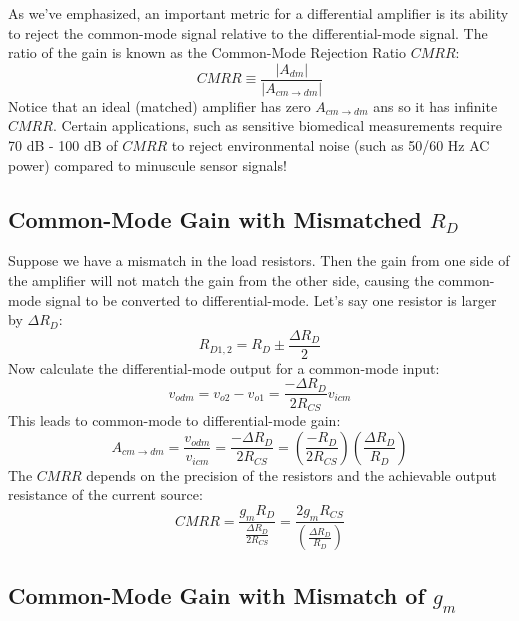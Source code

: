 As we've emphasized, an important metric for a differential amplifier is its ability to reject the common-mode signal relative to the differential-mode signal.  The ratio of the gain is known as the Common-Mode Rejection Ratio $CMRR$:
%
\begin{equation} 
	CMRR \equiv \frac{{\left| {{A_{dm}}} \right|}}{{\left| {{A_{cm \to dm}}} \right|}}
\end{equation}
%
Notice that an ideal (matched) amplifier has zero $A_{cm \to dm}$ ans so it has infinite $CMRR$. Certain applications, such as sensitive biomedical measurements require 70 dB - 100 dB of $CMRR$ to reject environmental noise (such as 50/60 Hz AC power) compared to minuscule sensor signals!



\subsection{Common-Mode Gain with Mismatched $R_D$}

Suppose we have a mismatch in the load resistors.  Then the gain from one side of the amplifier will not match the gain from the other side, causing the common-mode signal to be converted to differential-mode.  Let's say one resistor is larger by $\Delta R_{D}$:
%
\begin{equation} 
	{R_{D1,2}} = {R_D} \pm \frac{\Delta {R_D}}{2}
\end{equation}
% 
Now calculate the differential-mode output for a common-mode input:
%
\begin{equation}
	{v_{odm}} = {v_{o2}} - {v_{o1}} = \frac{{ - \Delta {R_D}}}{{2{R_{CS}}}}{v_{icm}}
\end{equation}
%
This leads to common-mode to differential-mode gain:
%
\begin{equation} 
	{A_{cm\to dm}} = \frac{{{v_{odm}}}}{{{v_{icm}}}} = \frac{{ - \Delta {R_D}}}{{2{R_{CS}}}} = \left( {\frac{{ - {R_D}}}{{2{R_{CS}}}}} \right)\left( {\frac{{\Delta {R_D}}}{{{R_D}}}} \right)
\end{equation}
% 
The $CMRR$  depends on the precision of the resistors and the achievable output resistance of the current source:
%
\begin{equation} 
	CMRR  = \frac{{{g_m}{R_D}}}{{\frac{{\Delta {R_D}}}{{2{R_{CS}}}}}} = \frac{{2{g_m}{R_{CS}}}}{{\left( {\frac{{\Delta {R_D}}}{{{R_D}}}} \right)}}
\end{equation}


\subsection{Common-Mode Gain with Mismatch of $g_m$}

